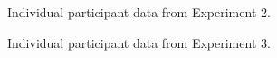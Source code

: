 \documentclass[
  letterpaper,
  DIV=11,
  numbers=noendperiod]{scrartcl}
\begin{document}
\begin{figure}


\caption{\label{fig-individualMCS}Individual participant data from
Experiment 2.}

\end{figure}%

\begin{figure}


\caption{\label{fig-individualdiscs}Individual participant data from
Experiment 3.}

\end{figure}%
\end{document}
